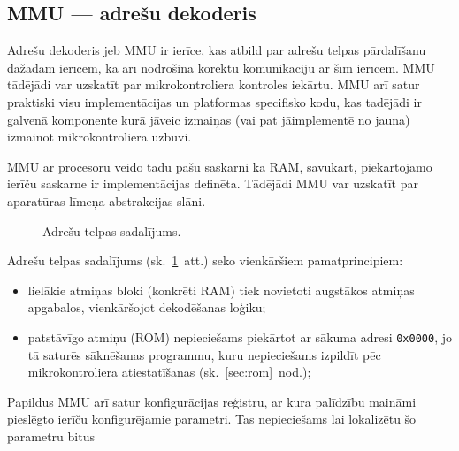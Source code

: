 

\subsection{MMU — adrešu dekoderis} \label{sec:mmu}
	Adrešu dekoderis jeb MMU ir ierīce, kas atbild par adrešu telpas
	pārdalīšanu dažādām ierīcēm, kā arī nodrošina korektu komunikāciju
	ar šīm ierīcēm. MMU tādējādi var uzskatīt par mikrokontroliera kontroles
	iekārtu. MMU arī satur praktiski visu implementācijas un platformas
	specifisko kodu, kas tadējādi ir galvenā komponente kurā jāveic izmaiņas
	(vai pat jāimplementē no jauna) izmainot mikrokontroliera uzbūvi.
	
	MMU ar procesoru veido tādu pašu saskarni kā RAM,
	savukārt, piekārtojamo ierīču saskarne ir implementācijas definēta.
	Tādējādi MMU var uzskatīt par aparatūras līmeņa abstrakcijas slāni.
	
	\begin{figure}[thp]
		\centering
		\def\svgwidth{0.9\textwidth}
		{\ttfamily\small}
		\caption{Adrešu telpas sadalījums.}
		\label{fig:memory-map}
	\end{figure}
	
	Adrešu telpas sadalījums (sk.~\ref{fig:memory-map}~att.) seko vienkāršiem pamatprincipiem:
	\begin{itemize}
		\item lielākie atmiņas bloki (konkrēti RAM) tiek novietoti augstākos
			atmiņas apgabalos, vienkāršojot dekodēšanas loģiku;
		\item patstāvīgo atmiņu (ROM) nepieciešams piekārtot ar sākuma
			adresi \texttt{0x0000}, jo tā saturēs sāknēšanas programmu,
			kuru nepieciešams izpildīt pēc mikrokontroliera atiestatīšanas
			(sk.~\ref{sec:rom}~nod.);
	\end{itemize}
	
	Papildus MMU arī satur konfigurācijas reģistru,
	ar kura palīdzību maināmi pieslēgto ierīču konfigurējamie parametri.
	Tas nepieciešams lai lokalizētu šo parametru bitus \todo
	


